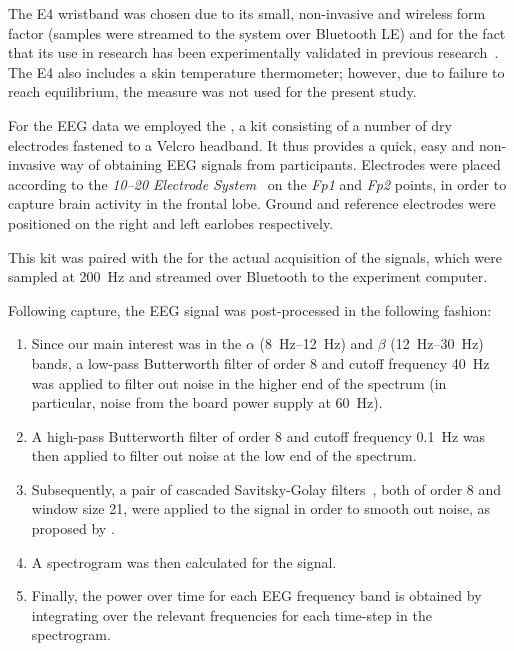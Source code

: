 \documentclass[10pt,letterpaper]{article}
\begin{document}
The E4 wristband was chosen due to its small, non-invasive and wireless form factor (samples were streamed to the system over Bluetooth LE) and for the fact that its use in research has been experimentally validated in previous research~\autocite{ragot2017emotion, mccarthy2016validation}.
The E4 also includes a skin temperature thermometer; however, due to failure to reach equilibrium, the measure was not used for the present study.

For the EEG data we employed the \textcite{openbci:headbandkit}, a kit consisting of a number of dry electrodes fastened to a Velcro headband.
It thus provides a quick, easy and non-invasive way of obtaining EEG signals from participants.
Electrodes were placed according to the \emph{10--20 Electrode System}~\autocite{eeg1020system:1961} on the \emph{Fp1} and \emph{Fp2} points, in order to capture brain activity in the frontal lobe.
Ground and reference electrodes were positioned on the right and left earlobes respectively.

This kit was paired with the \textcite{openbci:ganglion} for the actual acquisition of the signals, which were sampled at \SI{200}{\hertz} and streamed over Bluetooth to the experiment computer.

Following capture, the  EEG signal was post-processed in the following fashion:
% 
\begin{enumerate}
  \item Since our main interest was in the \( \alpha \) (\SIrange{8}{12}{\hertz}) and \( \beta \) (\SIrange{12}{30}{\hertz}) bands, a low-pass Butterworth filter of order 8 and cutoff frequency \SI{40}{\hertz} was applied to filter out noise in the higher end of the spectrum (in particular, noise from the board power supply at \SI{60}{\hertz}).
  \item A high-pass Butterworth filter of order 8 and cutoff frequency \SI{0.1}{\hertz} was then applied to filter out noise at the low end of the spectrum.
  \item Subsequently, a pair of cascaded Savitsky-Golay filters~\autocite{savitzky1964smoothing}, both of order 8 and window size 21, were applied to the signal in order to smooth out noise, as proposed by \textcite{agarwal2017eeg}.
  \item A spectrogram was then calculated for the signal.
  \item Finally, the power over time for each EEG frequency band is obtained by integrating over the relevant frequencies for each time-step in the spectrogram.
\end{enumerate}
\end{document}
